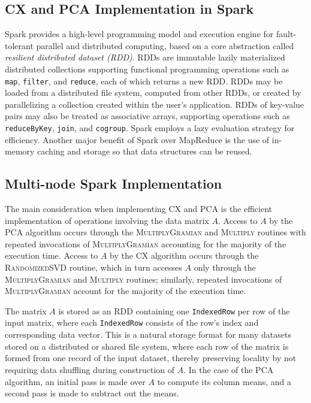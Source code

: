 
\subsection{CX and PCA Implementation in Spark}

Spark provides a high-level programming model and execution engine for
fault-tolerant parallel and distributed computing, based on a core abstraction
called \textit{resilient distributed dataset (RDD)}.  RDDs are immutable lazily
materialized distributed collections supporting functional programming
operations such as \texttt{map}, \texttt{filter}, and \texttt{reduce}, each of
which returns a new RDD.  RDDs may be loaded from a distributed file system,
computed from other RDDs, or created by parallelizing a collection created
within the user's application.  RDDs of key-value pairs may also be treated as
associative arrays, supporting operations such as \texttt{reduceByKey},
\texttt{join}, and \texttt{cogroup}.  Spark employs a lazy evaluation strategy
for efficiency.  Another major benefit of Spark over MapReduce is the use of
in-memory caching and storage so that data structures can be reused.

\subsection{Multi-node Spark Implementation}
\label{sec:cx_spark}
The main consideration when implementing CX and PCA is the efficient
implementation of operations involving the data matrix $A$.  Access to $A$ by
the PCA algorithm occurs through the \textsc{MultiplyGramian} and
\textsc{Multiply} routines with repeated invocations of
\textsc{MultiplyGramian} accounting for the majority of the execution time.
Access to $A$ by the CX algorithm occurs through the \textsc{RandomizedSVD}
routine, which in turn accesses $A$ only through the \textsc{MultiplyGramian}
and \textsc{Multiply} routines; similarly, repeated invocations of
\textsc{MultiplyGramian} account for the majority of the execution time.

The matrix $A$ is stored as an RDD containing one \texttt{IndexedRow} per row of the input matrix,
where each \texttt{IndexedRow} consists of the row's index and corresponding data vector.
This is a natural storage format for many datasets stored on a distributed or shared file
system, where each row of the matrix is formed from one record of the
input dataset, thereby preserving locality by not requiring data shuffling
during construction of $A$. In the case of the PCA algorithm, an initial pass is made over $A$ to compute
its column means, and a second pass is made to subtract out the means.

